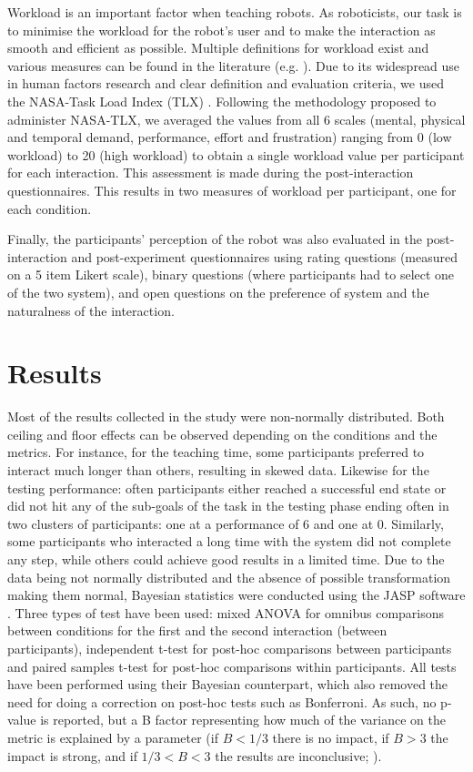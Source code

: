 Workload is an important factor when teaching robots. As roboticists, our task is to minimise the workload for the robot's user and to make the interaction as smooth and efficient as possible. Multiple definitions for workload exist and various measures can be found in the literature (e.g. \citealt{wierwille1983evaluation,moray2013mental}). Due to its widespread use in human factors research \citep{hart2006nasa} and clear definition and evaluation criteria, we used the NASA-Task Load Index (TLX) \citep{hart1988development}. Following the methodology proposed to administer NASA-TLX, we averaged the values from all 6 scales (mental, physical and temporal demand, performance, effort and frustration) ranging from 0 (low workload) to 20 (high workload) to obtain a single workload value per participant for each interaction. This assessment is made during the post-interaction questionnaires. This results in two measures of workload per participant, one for each condition.

Finally, the participants' perception of the robot was also evaluated in the post-interaction and post-experiment questionnaires using rating questions (measured on a 5 item Likert scale), binary questions (where participants had to select one of the two system), and open questions on the preference of system and the naturalness of the interaction. 

\section{Results}

Most of the results collected in the study were non-normally distributed. Both ceiling and floor effects can be observed depending on the conditions and the metrics. For instance, for the teaching time, some participants preferred to interact much longer than others, resulting in skewed data. Likewise for the testing performance: often participants either reached a successful end state or did not hit any of the sub-goals of the task in the testing phase ending often in two clusters of participants: one at a performance of 6 and one at 0.  Similarly, some participants who interacted a long time with the system did not complete any step, while others could achieve good results in a limited time. Due to the data being not normally distributed and the absence of possible transformation making them normal, Bayesian statistics were conducted using the JASP software \citep{jasp2018}. Three types of test have been used: mixed ANOVA for omnibus comparisons between conditions for the first and the second interaction (between participants), independent t-test for post-hoc comparisons between participants and paired samples t-test for post-hoc comparisons within participants. All tests have been performed using their Bayesian counterpart, which also removed the need for doing a correction on post-hoc tests such as Bonferroni. As such, no p-value is reported, but a B factor representing how much of the variance on the metric is explained by a parameter (if $B < 1/3$ there is no impact, if $B > 3$ the impact is strong, and if $1/3<B<3$ the results are inconclusive; \citealt{jeffreys1998theory,dienes2011bayesian}).

